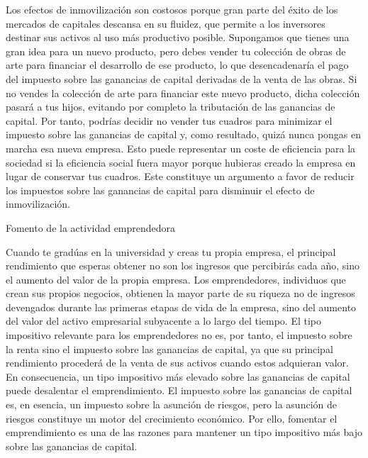 \documentclass[10pt,a4paper]{article}
\begin{document}
{Los efectos de inmovilización son costosos porque gran parte del éxito de los mercados de capitales descansa en su fluidez, que permite a los inversores destinar sus activos al uso más productivo posible. Supongamos que tienes una gran idea para un nuevo producto, pero debes vender tu colección de obras de arte para financiar el desarrollo de ese producto, lo que desencadenaría el pago del impuesto sobre las ganancias de capital derivadas de la venta de las obras. Si no vendes la colección de arte para financiar este nuevo producto, dicha colección pasará a tus hijos, evitando por completo la tributación de las ganancias de capital. Por tanto, podrías decidir no vender tus cuadros para minimizar el impuesto sobre las ganancias de capital y, como resultado, quizá nunca pongas en marcha esa nueva empresa. Esto puede representar un coste de eficiencia para la sociedad si la eficiencia social fuera mayor porque hubieras creado la empresa en lugar de conservar tus cuadros. Este constituye un argumento a favor de reducir los impuestos sobre las ganancias de capital para disminuir el efecto de inmovilización.}

Fomento de la actividad emprendedora

Cuando te gradúas en la universidad y creas tu propia empresa, el principal rendimiento que esperas obtener no son los ingresos que percibirás cada año, sino el aumento del valor de la propia empresa. Los emprendedores, individuos que crean sus propios negocios, obtienen la mayor parte de su riqueza no de ingresos devengados durante las primeras etapas de vida de la empresa, sino del aumento del valor del activo empresarial subyacente a lo largo del tiempo. El tipo impositivo relevante para los emprendedores no es, por tanto, el impuesto sobre la renta sino el impuesto sobre las ganancias de capital, ya que su principal rendimiento procederá de la venta de sus activos cuando estos adquieran valor. En consecuencia, un tipo impositivo más elevado sobre las ganancias de capital puede desalentar el emprendimiento. El impuesto sobre las ganancias de capital es, en esencia, un impuesto sobre la asunción de riesgos, pero la asunción de riesgos constituye un motor del crecimiento económico. Por ello, fomentar el emprendimiento es una de las razones para mantener un tipo impositivo más bajo sobre las ganancias de capital.
\end{document}
